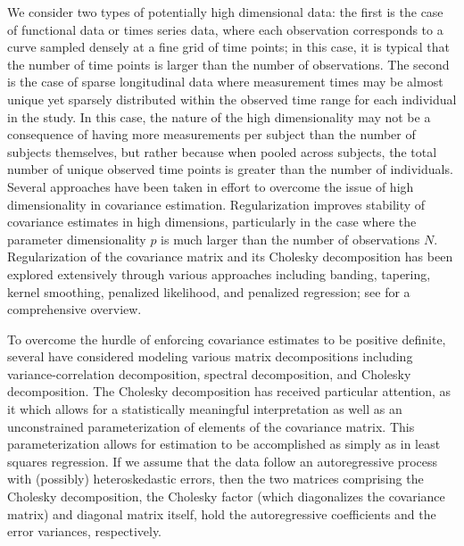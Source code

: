 We consider two types of potentially high dimensional data: the first is the case of functional data or times series data, where each observation corresponds to a curve sampled densely at a fine grid of time points; in this case, it is typical that the number of time points is larger than the number of observations. The second is the case of sparse longitudinal data where measurement times may be almost unique yet sparsely distributed within the observed time range for each individual in the study. In this case, the nature of the high dimensionality may not be a consequence of having more measurements per subject than the number of subjects themselves, but rather because when pooled across subjects, the total number of unique observed time points is greater than the number of individuals.  Several approaches have been taken in effort to overcome the issue of high dimensionality in covariance estimation. Regularization improves stability of covariance estimates in high dimensions, particularly in the case where the parameter dimensionality $p$ is much larger than the number of observations $N$. Regularization of the covariance matrix and its Cholesky decomposition has been explored extensively through various approaches including banding, tapering, kernel smoothing, penalized likelihood, and penalized regression; see \cite{pourahmadi2011covariance} for a comprehensive overview. 

\bigskip

To overcome the hurdle of enforcing covariance estimates to be positive definite, several have considered modeling various matrix decompositions including variance-correlation decomposition, spectral decomposition, and Cholesky decomposition. The Cholesky decomposition has received particular attention, as it which allows for a statistically meaningful interpretation as well as an unconstrained parameterization of elements of the covariance matrix. This parameterization allows for estimation to be accomplished as simply as in least squares regression. If we assume that the data follow an autoregressive process with (possibly) heteroskedastic errors, then the two matrices comprising the Cholesky decomposition, the Cholesky factor (which diagonalizes the covariance matrix) and diagonal matrix itself, hold the autoregressive coefficients and the error variances, respectively.

\bigskip

